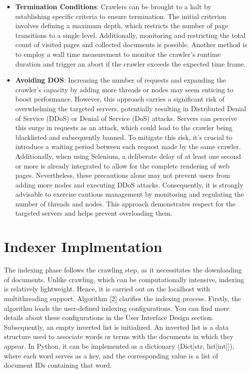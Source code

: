 \begin{itemize}
\item  \textbf{Termination Conditions}: Crawlers can be brought to a halt by establishing specific criteria to ensure termination. The initial criterion involves defining a maximum depth, which restricts the number of page transitions to a single level. Additionally, monitoring and restricting the total count of visited pages and collected documents is possible. Another method is to employ a wall time measurement to monitor the crawler's runtime duration and trigger an abort if the crawler exceeds the expected time frame.

\item  \textbf{Avoiding DOS}: Increasing the number of requests and expanding the crawler's capacity by adding more threads or nodes may seem enticing to boost performance. However, this approach carries a significant risk of overwhelming the targeted servers, potentially resulting in Distributed Denial of Service (DDoS) or Denial of Service (DoS) attacks. Servers can perceive this surge in requests as an attack, which could lead to the crawler being blacklisted and subsequently banned.
To mitigate this risk, it's crucial to introduce a waiting period between each request made by the same crawler. Additionally, when using Selenium, a deliberate delay of at least one second or more is already integrated to allow for the complete rendering of web pages. Nevertheless, these precautions alone may not prevent users from adding more nodes and executing DDoS attacks. Consequently, it is strongly advisable to exercise cautious management by monitoring and regulating the number of threads and nodes. This approach demonstrates respect for the targeted servers and helps prevent overloading them.
\end{itemize}

\section{Indexer Implmentation}

The indexing phase follows the crawling step, as it necessitates the downloading of documents. Unlike crawling, which can be computationally intensive, indexing is relatively lightweight. Hence, it is carried out on the localhost with multithreading support.
Algorithm [2] clarifies the indexing process. Firstly, the algorithm loads the user-defined indexing configurations. You can find more details about these configurations in the User Interface Design section. Subsequently, an empty inverted list is initialized. An inverted list is a data structure used to associate words or terms with the documents in which they appear. In Python, it can be implemented as a dictionary (Dict[str, list[int]]), where each word serves as a key, and the corresponding value is a list of document IDs containing that word.


